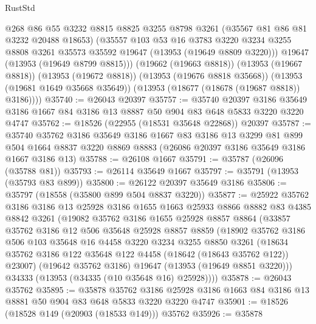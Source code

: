 \begin{lexlean}{RustStd}
\begin{coremodule}
          @268
          @86
          @55
          @3232
          @8815
          @8825
          @3255
          @8798
          @3261
          (@35567 @81 @86 @81 @3232 @20488 @18653)
          (@35557
            @103
            @53
            @16
            @3783
            @3220
            @3234
            @3255
            @8808
            @3261
            @35573
            @35592
            @19647
            (@13953 (@19649 @8809 @3220)))
          @19647
          (@13953 (@19649 @8799 @8815)))
        (@19662 (@19663 @8818))
        (@13953 (@19667 @8818))
        (@13953 (@19672 @8818))
        (@13953 (@19676 @8818 @35668))
        (@13953 (@19681 @1649 @35668 @35649))
        (@13953 (@18677 (@18678 (@19687 @8818)) @3186))))
@35740 := @26043 @20397
@35757 := @35740
    @20397
    @3186
    @35649
    @3186
    @1667
    @84
    @3186
    @13
    @8887
    @50
    @904
    @83
    @648
    @5833
    @3220
    @3220
    @4747
@35762 := @18526 (@22955 (@18531 @35648 @22868)) @20397
@35787 := @35740
    @35762
    @3186
    @35649
    @3186
    @1667
    @83
    @3186
    @13
    @3299
    @81
    @899
    @504
    @1664
    @8837
    @3220
    @8869
    @8883
    (@26086 @20397 @3186 @35649 @3186 @1667 @3186 @13)
@35788 := @26108 @1667
@35791 := @35787 (@26096 (@35788 @81))
@35793 := @26114 @35649 @1667
@35797 := @35791 (@13953 (@35793 @83 @899))
@35800 := @26122 @20397 @35649 @3186
@35806 := @35797 (@18558 (@35800 @899 @504 @8837 @3220))
@35877 := @25922
    @35762
    @3186
    @3186
    @13
    @25928
    @3186
    @1655
    @1663
    @25933
    @8866
    @8882
    @83
    @4385
    @8842
    @3261
    (@19082
      @35762
      @3186
      @1655
      @25928
      @8857
      @8864
      (@33857
        @35762
        @3186
        @12
        @506
        @35648
        @25928
        @8857
        @8859
        (@18902
          @35762
          @3186
          @506
          @103
          @35648
          @16
          @4458
          @3220
          @3234
          @3255
          @8850
          @3261
          (@18634 @35762 @3186 @122 @35648 @122 @4458 (@18642 (@18643 @35762 @122)) @23007)
          (@19642 @35762 @3186)
          @19647
          (@13953 (@19649 @8851 @3220)))
        @34333
        (@13953 (@34335 (@10 @35648 @16) @25928))))
@35878 := @26043 @35762
@35895 := @35878
    @35762
    @3186
    @25928
    @3186
    @1663
    @84
    @3186
    @13
    @8881
    @50
    @904
    @83
    @648
    @5833
    @3220
    @3220
    @4747
@35901 := @18526 (@18528 @149 (@20903 (@18533 @149))) @35762
@35926 := @35878

\end{coremodule}
\end{lexlean}
